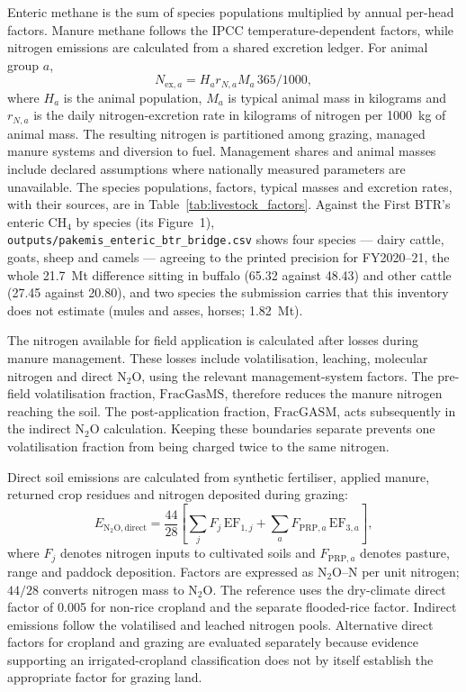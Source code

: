 \documentclass[essd]{copernicus}
\begin{document}
Enteric methane is the sum of species populations multiplied by annual per-head factors. Manure methane follows the IPCC temperature-dependent factors, while nitrogen emissions are calculated from a shared excretion ledger. For animal group $a$,
\begin{equation}
 N_{\mathrm{ex},a}=H_a r_{N,a} M_a\,365/1000,
 \label{eq:nitrogen_excretion}
\end{equation}
where $H_a$ is the animal population, $M_a$ is typical animal mass in kilograms and $r_{N,a}$ is the daily nitrogen-excretion rate in kilograms of nitrogen per 1000~kg of animal mass. The resulting nitrogen is partitioned among grazing, managed manure systems and diversion to fuel. Management shares and animal masses include declared assumptions where nationally measured parameters are unavailable. The species populations, factors, typical masses and excretion rates, with their sources, are in Table~\ref{tab:livestock_factors}. Against the First BTR's enteric CH$_4$ by species (its Figure~1), \texttt{outputs/pakemis\_enteric\_btr\_bridge.csv} shows four species --- dairy cattle, goats, sheep and camels --- agreeing to the printed precision for FY2020--21, the whole \SI{21.7}{\mega\tonne} difference sitting in buffalo (\num{65.32} against \num{48.43}) and other cattle (\num{27.45} against \num{20.80}), and two species the submission carries that this inventory does not estimate (mules and asses, horses; \SI{1.82}{\mega\tonne}).


The nitrogen available for field application is calculated after losses during manure management. These losses include volatilisation, leaching, molecular nitrogen and direct N$_2$O, using the relevant management-system factors. The pre-field volatilisation fraction, $\mathrm{FracGasMS}$, therefore reduces the manure nitrogen reaching the soil. The post-application fraction, $\mathrm{FracGASM}$, acts subsequently in the indirect N$_2$O calculation. Keeping these boundaries separate prevents one volatilisation fraction from being charged twice to the same nitrogen.

Direct soil emissions are calculated from synthetic fertiliser, applied manure, returned crop residues and nitrogen deposited during grazing:
\begin{equation}
 E_{\mathrm{N_2O,direct}}
 =\frac{44}{28}\left[
 \sum_j F_j\,\mathrm{EF}_{1,j}
 +\sum_a F_{\mathrm{PRP},a}\,\mathrm{EF}_{3,a}
 \right],
 \label{eq:managed_soil_nitrogen}
\end{equation}
where $F_j$ denotes nitrogen inputs to cultivated soils and $F_{\mathrm{PRP},a}$ denotes pasture, range and paddock deposition. Factors are expressed as N$_2$O--N per unit nitrogen; $44/28$ converts nitrogen mass to N$_2$O. The reference uses the dry-climate direct factor of 0.005 for non-rice cropland and the separate flooded-rice factor. Indirect emissions follow the volatilised and leached nitrogen pools. Alternative direct factors for cropland and grazing are evaluated separately because evidence supporting an irrigated-cropland classification does not by itself establish the appropriate factor for grazing land.
\end{document}
